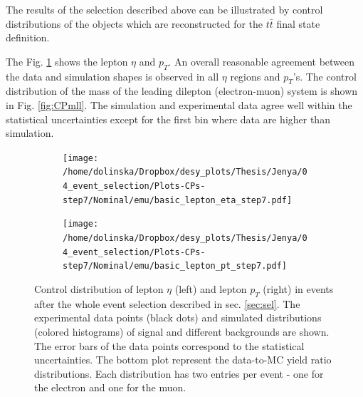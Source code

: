 The results of the selection described above can be illustrated by control distributions of the objects which are reconstructed for the $t\bar{t}$
final state definition.

The Fig. \ref{fig:CPetaptLep} shows the lepton $\eta$ and $p_{T}$. An overall reasonable agreement between the data and simulation shapes is observed in all $\eta$ regions
and $p_{T}$'s. The control distribution of the mass of the leading dilepton (electron-muon) system is shown in Fig. \ref{fig:CPmll}. The simulation and experimental data
agree well within the statistical uncertainties except for the first bin where data are higher than simulation.

 \begin{figure}[h]
 \centering
 \begin{subfigure}
   \centering
   \texttt{[image: /home/dolinska/Dropbox/desy\_plots/Thesis/Jenya/04\_event\_selection/Plots-CPs-step7/Nominal/emu/basic\_lepton\_eta\_step7.pdf]}
 \end{subfigure}
 \begin{subfigure}
   \centering
   \texttt{[image: /home/dolinska/Dropbox/desy\_plots/Thesis/Jenya/04\_event\_selection/Plots-CPs-step7/Nominal/emu/basic\_lepton\_pt\_step7.pdf]}
 \end{subfigure}
 \caption{Control distribution of lepton $\eta$ (left) and lepton $p_{T}$ (right) in events after the whole event selection described in sec. \ref{sec:sel}. 
 The experimental data points (black dots)
 and simulated distributions (colored histograms) of signal and different backgrounds are shown. The error bars of the data points
 correspond to the statistical uncertainties. The bottom plot represent the data-to-MC yield ratio distributions.
 Each distribution has two entries per event - one for the electron and one for the muon.}
 \label{fig:CPetaptLep}
 \end{figure}
%  
 
